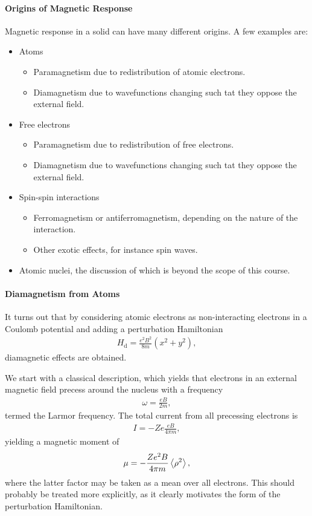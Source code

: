 \paragraph{Origins of Magnetic Response}
Magnetic response in a solid can have many different origins. A few examples are:
\begin{itemize}
	\item Atoms
	\begin{itemize}
		\item Paramagnetism due to redistribution of atomic electrons.
		\item Diamagnetism due to wavefunctions changing such tat they oppose the external field.
	\end{itemize}
	\item Free electrons
	\begin{itemize}
		\item Paramagnetism due to redistribution of free electrons.
		\item Diamagnetism due to wavefunctions changing such tat they oppose the external field.
	\end{itemize}
	\item Spin-spin interactions
	\begin{itemize}
		\item Ferromagnetism or antiferromagnetism, depending on the nature of the interaction.
		\item Other exotic effects, for instance spin waves.
	\end{itemize}
	\item Atomic nuclei, the discussion of which is beyond the scope of this course.
\end{itemize}

\paragraph{Diamagnetism from Atoms}
It turns out that by considering atomic electrons as non-interacting electrons in a Coulomb potential and adding a perturbation Hamiltonian
\begin{align*}
	H_{\text{d}} = \frac{e^{2}B^{2}}{8m}(x^{2} + y^{2}),
\end{align*}
diamagnetic effects are obtained.

We start with a classical description, which yields that electrons in an external magnetic field precess around the nucleus with a frequency
\begin{align*}
	\omega = \frac{eB}{2m},
\end{align*}
termed the Larmor frequency. The total current from all precessing electrons is
\begin{align*}
	I = -Ze\frac{eB}{4\pi m},
\end{align*}
yielding a magnetic moment of
\begin{align*}
	\mu = -\frac{Ze^{2}B}{4\pi m}\expval{\rho^{2}},
\end{align*}
where the latter factor may be taken as a mean over all electrons. This should probably be treated more explicitly, as it clearly motivates the form of the perturbation Hamiltonian.

